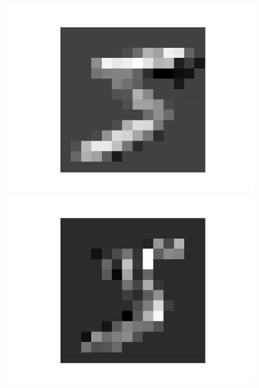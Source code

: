 \documentclass[11pt]{article}
\begin{document}
\begin{figure}[h]
\begin{minipage}{0.2\linewidth}
	\includegraphics[width=\linewidth]{../graphics/mnist_5/conv_pool/lower_horiz_pooled.png}
\end{minipage}
\hfill
\begin{minipage}{0.2\linewidth}
	\centering
	\includegraphics[width=\linewidth]{../graphics/mnist_5/conv_pool/right_vert_pooled.png}
\end{minipage}
\\
	\begin{minipage}{0.2\linewidth}
	\centering

\end{minipage}
\end{figure}
\end{document}
